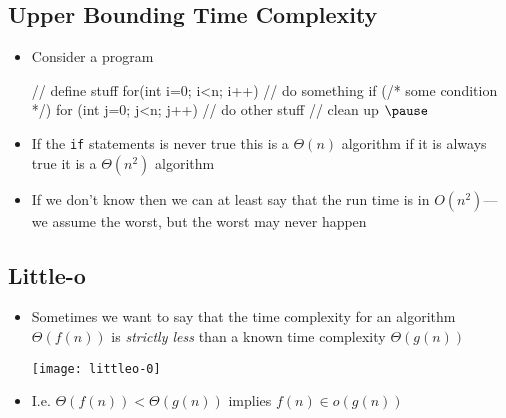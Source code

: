 
\begin{slide}
\section[-1]{Upper Bounding Time Complexity}

\begin{PauseHighLight}
  \begin{itemize}
  \item Consider a program
\begin{java}
// define stuff
for(int i=0; i<n; i++)  {
  // do something
  if (/* some condition */) {
    for (int j=0; j<n; j++) {
      // do other stuff
    }
  }
}
// clean up $\pause$
\end{java}\vspace{-0.5cm}
\item If the \texttt{if} statements is never true this is a $\Theta(n)$
  algorithm if it is always true it is a $\Theta(n^2)$ algorithm\pause
\item If we don't know then we can at least say that the run time is in
  $O(n^2)$\pause---we assume the worst, but the worst may never happen\pauseb
  \end{itemize}
\end{PauseHighLight}

\end{slide}


\begin{slide}
\section{Little-o}

\begin{PauseHighLight}
  \begin{itemize}
  \item Sometimes we want to say that the time complexity for an
    algorithm $\Theta(f(n))$ is \emph{strictly less} than a known time
    complexity $\Theta(g(n))$
    \begin{center}
      \texttt{[image: littleo-0]}\pause
    \end{center}
  \item I.e. $\Theta(f(n)) < \Theta(g(n))$ implies $f(n) \in o(g(n))$\pause
  \end{itemize}
\end{PauseHighLight}

\end{slide}

